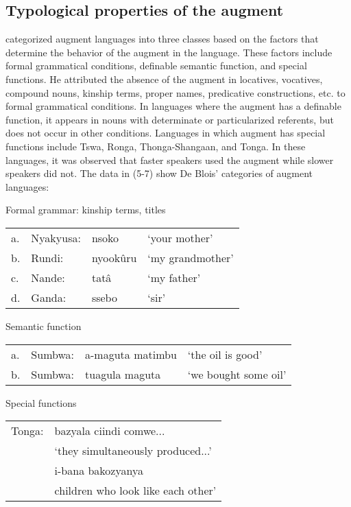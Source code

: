 \documentclass[output=paper]{langscibook}
\begin{document}
\subsection{Typological properties of the augment}
\citet{blois1970augment} categorized augment languages into three classes based on the factors that determine the behavior of the augment in the language. These factors include formal grammatical conditions, definable semantic function, and special functions. He attributed the absence of the augment in locatives, vocatives, compound nouns, kinship terms, proper names, predicative constructions, etc. to formal grammatical conditions. In languages where the augment has a definable function, it appears in nouns with determinate or particularized referents, but does not occur in other conditions. Languages in which augment has special functions include Tswa, Ronga, Thonga-Shangaan, and Tonga. In these languages, it was observed that faster speakers used the augment while slower speakers did not. The data in (5-7) show De Blois’ categories of augment languages:

\begin{exe}
\ex Formal grammar: kinship terms, titles \\
\label{hayagusii5}
\begin{tabular}{llll}
 a. &	Nyakyusa: &	nsoko 	&	‘your mother’ \\
b. &	Rundi:	&	nyookûru &	‘my grandmother’\\
c.	& Nande: &		tatâ	&	‘my father’\\
d. &	Ganda:	&	ssebo	&	‘sir’\\
\end{tabular}

\ex Semantic function \\
\label{hayagusii6}
\begin{tabular}{llll}
 a. &	Sumbwa: &	a-maguta matimbu &	‘the oil is good’ \\
b. &	Sumbwa: &	tuagula maguta &	‘we bought some oil’\\
\end{tabular}

\ex Special functions \\
\label{hayagusii7}
\begin{tabular}{ll}
   Tonga:  & bazyala ciindi comwe...  \\
     & ‘they simultaneously produced...' \\
     & i-bana bakozyanya \\
     & children who look like each other’\\
\end{tabular}
\end{exe}
\end{document}

